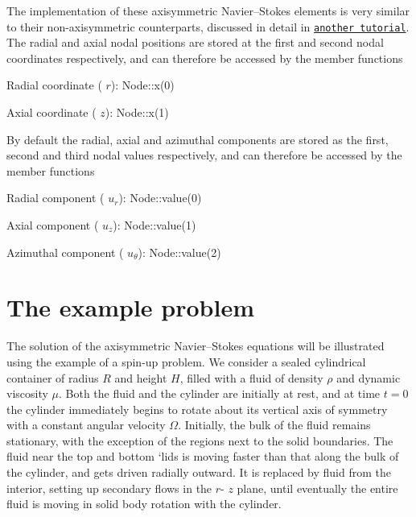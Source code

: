 The implementation of these axisymmetric Navier--Stokes elements is very similar to their non-\/axisymmetric counterparts, discussed in detail in \href{../../../navier_stokes/driven_cavity/html/index.html#element_types}{\tt another tutorial}. The radial and axial nodal positions are stored at the first and second nodal coordinates respectively, and can therefore be accessed by the member functions
\begin{DoxyItemize}
\item Radial coordinate ( $ r $)\+: {\ttfamily Node\+::x(0)} 
\item Axial coordinate ( $ z $)\+: {\ttfamily Node\+::x(1)} 
\end{DoxyItemize}

By default the radial, axial and azimuthal components are stored as the first, second and third nodal values respectively, and can therefore be accessed by the member functions
\begin{DoxyItemize}
\item Radial component ( $ u_r $)\+: {\ttfamily Node\+::value(0)} 
\item Axial component ( $ u_z $)\+: {\ttfamily Node\+::value(1)} 
\item Azimuthal component ( $ u_\theta $)\+: {\ttfamily Node\+::value(2)} 
\end{DoxyItemize}



 

\hypertarget{index_example}{}\section{The example problem}\label{index_example}
The solution of the axisymmetric Navier--Stokes equations will be illustrated using the example of a spin-\/up problem. We consider a sealed cylindrical container of radius $ R $ and height $ H $, filled with a fluid of density $ \rho $ and dynamic viscosity $ \mu $. Both the fluid and the cylinder are initially at rest, and at time $ t=0 $ the cylinder immediately begins to rotate about its vertical axis of symmetry with a constant angular velocity $ \Omega $. Initially, the bulk of the fluid remains stationary, with the exception of the regions next to the solid boundaries. The fluid near the top and bottom `lids\textquotesingle{} is moving faster than that along the bulk of the cylinder, and gets driven radially outward. It is replaced by fluid from the interior, setting up secondary flows in the $ r $-\/ $ z $ plane, until eventually the entire fluid is moving in solid body rotation with the cylinder.

